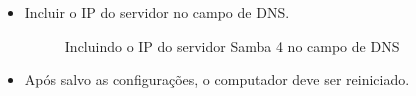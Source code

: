 \begin{itemize}
	\item Incluir o IP do servidor no campo de DNS.
	\begin{figure}[ht]
			\centering
			\caption{Incluindo o IP do servidor Samba 4 no campo de DNS}
			\label{propriedades_tcpip}
	\end{figure}
	
	\item Após salvo as configurações, o computador deve ser reiniciado.
	
\end{itemize}